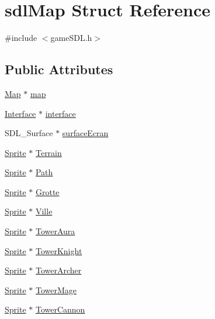 \hypertarget{structsdl_map}{\section{sdl\-Map Struct Reference}
\label{structsdl_map}
}


{\ttfamily \#include $<$game\-S\-D\-L.\-h$>$}

\subsection*{Public Attributes}
\begin{DoxyCompactItemize}
\item 
\hyperlink{map_8h_af9824e0a3cac785d07b43c5265fddd5a}{Map} $\ast$ \hyperlink{structsdl_map_a45740d4484afe0a6d1fe87d7fe9eb74f}{map}
\item 
\hyperlink{interface_8h_a2bc6028823fa0c49a7d38abca6364e6f}{Interface} $\ast$ \hyperlink{structsdl_map_a759be5e12b384cc485d0d9198b60aab5}{interface}
\item 
S\-D\-L\-\_\-\-Surface $\ast$ \hyperlink{structsdl_map_a05ce72876b384ab36d2bc2e78cbb4d2e}{surface\-Ecran}
\item 
\hyperlink{struct_sprite}{Sprite} $\ast$ \hyperlink{structsdl_map_abdb954fdbc6c1560425b8131a1333644}{Terrain}
\item 
\hyperlink{struct_sprite}{Sprite} $\ast$ \hyperlink{structsdl_map_aadc6c5b4f6c6325cca31f1b439d41f39}{Path}
\item 
\hyperlink{struct_sprite}{Sprite} $\ast$ \hyperlink{structsdl_map_ace0a514e63e0cfefd14580b551fb36cd}{Grotte}
\item 
\hyperlink{struct_sprite}{Sprite} $\ast$ \hyperlink{structsdl_map_a45977cb3436f7ede49da5446f19e7919}{Ville}
\item 
\hyperlink{struct_sprite}{Sprite} $\ast$ \hyperlink{structsdl_map_a72869f765a524d7ce53dac7e30a87344}{Tower\-Aura}
\item 
\hyperlink{struct_sprite}{Sprite} $\ast$ \hyperlink{structsdl_map_a17cb76e625d269d401a1e878436377dd}{Tower\-Knight}
\item 
\hyperlink{struct_sprite}{Sprite} $\ast$ \hyperlink{structsdl_map_a1a34a71be9d9e2b9e3f9c9dbb6ecbda7}{Tower\-Archer}
\item 
\hyperlink{struct_sprite}{Sprite} $\ast$ \hyperlink{structsdl_map_aedc2a06f1f47c80edc6b7510830202d6}{Tower\-Mage}
\item 
\hyperlink{struct_sprite}{Sprite} $\ast$ \hyperlink{structsdl_map_af8621dd16aaf2811edb2cd5b667de435}{Tower\-Cannon}

\end{DoxyCompactItemize}
